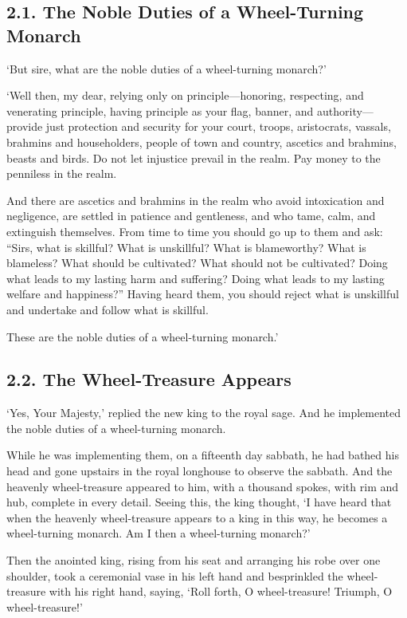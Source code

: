 \documentclass[12pt,openany]{book}%
\begin{document}
\subsection*{2.1. The Noble Duties of a Wheel-Turning Monarch }

‘But sire, what are the noble duties of a wheel-turning monarch?’ 

‘Well then, my dear, relying only on principle—honoring, respecting, and venerating principle, having principle as your flag, banner, and authority—provide just protection and security for your court, troops, aristocrats, vassals, brahmins and householders, people of town and country, ascetics and brahmins, beasts and birds. Do not let injustice prevail in the realm. Pay money to the penniless in the realm. 

And there are ascetics and brahmins in the realm who avoid intoxication and negligence, are settled in patience and gentleness, and who tame, calm, and extinguish themselves. From time to time you should go up to them and ask: “Sirs, what is skillful? What is unskillful? What is blameworthy? What is blameless? What should be cultivated? What should not be cultivated? Doing what leads to my lasting harm and suffering? Doing what leads to my lasting welfare and happiness?” Having heard them, you should reject what is unskillful and undertake and follow what is skillful. 

These are the noble duties of a wheel-turning monarch.’ 

\subsection*{2.2. The Wheel-Treasure Appears }

‘Yes, Your Majesty,’ replied the new king to the royal sage. And he implemented the noble duties of a wheel-turning monarch. 

While he was implementing them, on a fifteenth day sabbath, he had bathed his head and gone upstairs in the royal longhouse to observe the sabbath. And the heavenly wheel-treasure appeared to him, with a thousand spokes, with rim and hub, complete in every detail. Seeing this, the king thought, ‘I have heard that when the heavenly wheel-treasure appears to a king in this way, he becomes a wheel-turning monarch. Am I then a wheel-turning monarch?’ 

Then the anointed king, rising from his seat and arranging his robe over one shoulder, took a ceremonial vase in his left hand and besprinkled the wheel-treasure with his right hand, saying, ‘Roll forth, O wheel-treasure! Triumph, O wheel-treasure!’ 
\end{document}
